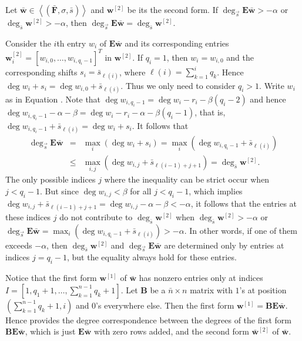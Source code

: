 \begin{lem}
\label{lem:degreeCorrespondence}Let $\bar{\mathbf{w}}\in\left\langle \left(\bar{\mathbf{F}},\sigma,\bar{s}\right)\right\rangle $
and $\mathbf{w}^{[2]}$ be its the second form. If $\deg_{\vec{s}}\mathbf{E}\bar{\mathbf{w}}>-\alpha$
or $\deg_{\bar{s}}\mathbf{w}^{[2]}>-\alpha$, then $\deg_{\vec{s}}\mathbf{E}\bar{\mathbf{w}}=\deg_{\bar{s}}\mathbf{w}^{[2]}$. \end{lem}
\begin{pf}
Consider the $i$th entry $w_{i}$ of $\mathbf{E}\bar{\mathbf{w}}$
and its corresponding entries $\mathbf{w}_{i}^{[2]}=\left[w_{i,0},\dots,w_{i,q_{i}-1}\right]^{T}$
in $\mathbf{w}^{[2]}$. If $q_{i}=1$, then $w_{i}=w_{i,0}$ and the
corresponding shifts $s_{i}=\bar{s}_{\ell(i)}$, where $\ell(i)=\sum_{k=1}^{i}q_{k}$.
Hence $\deg w_{i}+s_{i}=\deg w_{i,0}+\bar{s}_{\ell(i)}$. Thus we
only need to consider $q_{i}>1$. Write $w_{i}$ as in Equation .
Note that $\deg w_{i,q_{i}-1}=\deg w_{i}-r_{i}-\beta\left(q_{i}-2\right)$
and hence $\deg w_{i,q_{i}-1}-\alpha-\beta=\deg w_{i}-r_{i}-\alpha-\beta\left(q_{i}-1\right)$,
that is, $\deg w_{i,q_{i}-1}+\bar{s}_{\ell(i)}=\deg w_{i}+s_{i}$.
It follows that \begin{eqnarray*}
\deg_{\vec{s}}\mathbf{E}\bar{\mathbf{w}} & = & \max_{i}(\deg w_{i}+s_{i})=\max_{i}(\deg w_{i,q_{i}-1}+\bar{s}_{\ell(i)})\\
 & \le & \max_{i,j}\left(\deg w_{i,j}+\bar{s}_{\ell(i-1)+j+1}\right)=\deg_{\bar{s}}\mathbf{w}^{[2]}.\end{eqnarray*}
 The only possible indices $j$ where the inequality can be strict
occur when $j<q_{i}-1$. But since $\deg w_{i,j}<\beta$ for all $j<q_{i}-1$,
which implies $\deg w_{i,j}+\bar{s}_{\ell(i-1)+j+1}=\deg w_{i,j}-\alpha-\beta<-\alpha$,
it follows that the entries at these indices $j$ do not contribute
to $\deg_{\bar{s}}\mathbf{w}^{[2]}$ when $\deg_{\bar{s}}\mathbf{w}^{[2]}>-\alpha$
or $\deg_{\vec{s}}\mathbf{E}\bar{\mathbf{w}}=\max_{i}(\deg w_{i,q_{i}-1}+\bar{s}_{\ell(i)})>-\alpha$.
In other words, if one of them exceeds $-\alpha$, then $\deg_{\bar{s}}\mathbf{w}^{[2]}$
and $\deg_{\vec{s}}\mathbf{E}\bar{\mathbf{w}}$ are determined only
by entries at indices $j=q_{i}-1$, but the equality always hold for
these entries. \end{pf}
\begin{rem}
Notice that the first form $\mathbf{w}^{\left[1\right]}$ of $\bar{\mathbf{w}}$
has nonzero entries only at indices $I=[1,q_{1}+1,\dots,\sum_{k=1}^{n-1}q_{k}+1]$.
Let $\mathbf{B}$ be a $\bar{n}\times n$ matrix with $1$'s at position
$(\sum_{k=1}^{n-1}q_{k}+1,i)$ and 0's everywhere else. Then the first
form \textup{ $\mathbf{w}^{[1]}=\mathbf{B}\mathbf{E}\bar{\mathbf{w}}$.}
Hence  provides the degree correspondence
between the degrees of the first form $\mathbf{B}\mathbf{E}\bar{\mathbf{w}}$,
which is just $\mathbf{E}\bar{\mathbf{w}}$ with zero rows added,
and the second form $\bar{\mathbf{w}}^{[2]}$ of $\bar{\mathbf{w}}$.\end{rem}
